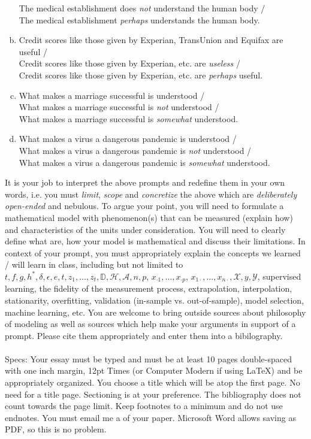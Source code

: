 \documentclass[12pt]{article}
\begin{document}
\begin{enumerate}[(a)]
The medical establishment does \textit{not} understand the human body / \\
The medical establishment \textit{perhaps} understands the human body.
\item Credit scores like those given by Experian, TransUnion and Equifax are useful / \\
Credit scores like those given by Experian, etc. are \textit{useless} / \\
Credit scores like those given by Experian, etc. are \textit{perhaps} useful.
\item What makes a marriage successful is understood / \\
What makes a marriage successful is \emph{not} understood / \\
What makes a marriage successful is \emph{somewhat} understood.
\item What makes a virus a dangerous pandemic is understood / \\
What makes a virus a dangerous pandemic is \emph{not} understood / \\
What makes a virus a dangerous pandemic is \emph{somewhat} understood.
\end{enumerate}

\noindent It is your job to interpret the above prompts and redefine them in your own words, i.e. you must \textit{limit}, \textit{scope} and \textit{concretize} the above which are \textit{deliberately open-ended} and nebulous. To argue your point, you will need to formulate a mathematical model with phenomenon(s) that can be measured (explain how) and characteristics of the units under consideration. You will need to clearly define what  are, how your model is mathematical and discuss their limitations. In context of your prompt, you must appropriately explain the concepts we learned / will learn in class, including but not limited to $t ,f, g, h^*, \delta, \epsilon, e, t, z_1, \ldots, z_t, \mathbb{D}, \mathcal{H}, \mathcal{A}, n, p$, $x_{\cdot 1}, \ldots, x_{\cdot p}$, $x_{1 \cdot}, \ldots, x_{n \cdot}, \mathcal{X}, y, \mathcal{Y}$, supervised learning, the fidelity of the measurement process, extrapolation, interpolation, stationarity, overfitting, validation (in-sample vs. out-of-sample), model selection, machine learning, etc. You are welcome to bring outside sources about philosophy of modeling as well as sources which help make your arguments in support of a prompt. Please cite them appropriately and enter them into a bibilography.\\
~\\
Specs: Your essay must be typed and must be at least 10 pages double-spaced with one inch margin, 12pt Times (or Computer Modern if using \LaTeX) and be appropriately organized. You choose a title which will be atop the first page. No need for a title page. Sectioning is at your preference. The bibliography does not count towards the page limit. Keep footnotes to a minimum and do not use endnotes. You must email me a   of your paper. Microsoft Word allows saving as PDF, so this is no problem.

\end{document}
